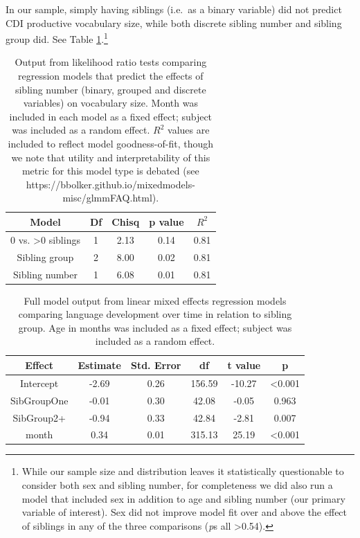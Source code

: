 \documentclass[
  man,floatsintext]{apa6}
\begin{document}
In our sample, simply having siblings (i.e.~as a binary variable) did not predict CDI productive vocabulary size, while both discrete sibling number and sibling group did. See Table \ref{tab:table-sibling-model-output}.\footnote{While our sample size and distribution leaves it statistically questionable to consider both sex and sibling number, for completeness we did also run a model that included sex in addition to age and sibling number (our primary variable of interest). Sex did not improve model fit over and above the effect of siblings in any of the three comparisons (\emph{p}s all \textgreater0.54).}

\begin{longtable}[t]{ccccc}
\caption{\label{tab:table-sibling-model-output}Output from likelihood ratio tests comparing regression models that predict the effects of sibling number (binary, grouped and discrete variables) on vocabulary size. Month was included in each model as a fixed effect; subject was included as a random effect. $R^{2}$ values are included to reflect model goodness-of-fit, though we note that utility and interpretability of this metric for this model type is debated (see https://bbolker.github.io/mixedmodels-misc/glmmFAQ.html).}\\
\toprule
Model & Df & Chisq & p value & $R^{2}$\\
\midrule
0 vs. >0 siblings & 1 & 2.13 & 0.14 & 0.81\\
Sibling group & 2 & 8.00 & 0.02 & 0.81\\
Sibling number & 1 & 6.08 & 0.01 & 0.81\\
\bottomrule
\end{longtable}

\newpage

\begin{longtable}[t]{cccccc}
\caption{\label{tab:table-sibgroup-model-summary}Full model output from linear mixed effects regression models comparing language development over time in relation to sibling group. Age in months was included as a fixed effect; subject was included as a random effect.}\\
\toprule
Effect & Estimate & Std. Error & df & t value & p\\
\midrule
Intercept & -2.69 & 0.26 & 156.59 & -10.27 & <0.001\\
SibGroupOne & -0.01 & 0.30 & 42.08 & -0.05 & 0.963\\
SibGroup2+ & -0.94 & 0.33 & 42.84 & -2.81 & 0.007\\
month & 0.34 & 0.01 & 315.13 & 25.19 & <0.001\\
\bottomrule
\end{longtable}
\end{document}
